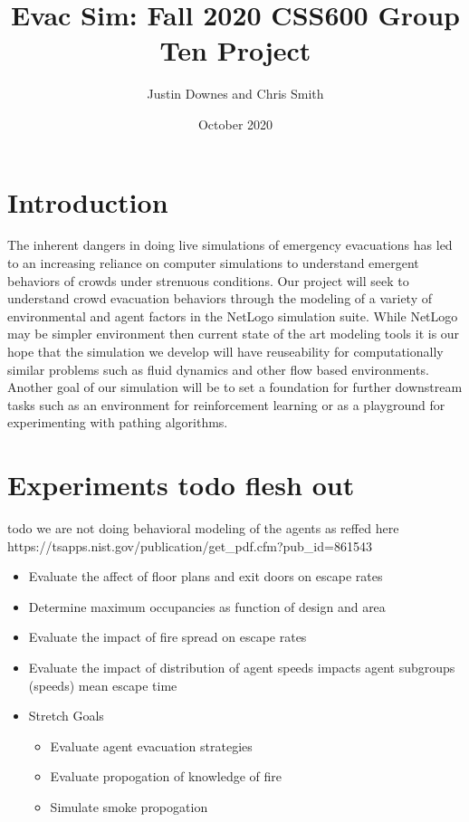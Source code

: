 \documentclass[12pt,letterpaper]{article}
\begin{document}
\title{\vspace{-3cm}Evac Sim: Fall 2020 CSS600 Group Ten Project}
\author{Justin Downes and Chris Smith}
\date{October 2020}
\maketitle

\section {Introduction}

The inherent dangers in doing live simulations of emergency evacuations has led to an increasing reliance on computer simulations to understand emergent behaviors of crowds under strenuous conditions\cite{almeidaCrowdSimulationModeling2013}.  Our project will seek to understand crowd evacuation behaviors through the modeling of a variety of environmental and agent factors in the NetLogo simulation suite. While NetLogo may be simpler environment then current state of the art modeling tools it is our hope that the simulation we develop will have reuseability for computationally similar problems such as fluid dynamics and other flow based environments. Another goal of our simulation will be to set a foundation for further downstream tasks such as an environment for reinforcement learning or as a playground for experimenting with pathing algorithms.

\section {Experiments todo flesh out}
todo we are not doing behavioral modeling of the agents as reffed here  https://tsapps.nist.gov/publication/get\_pdf.cfm?pub\_id=861543

\begin{itemize}
\item Evaluate the affect of floor plans and exit doors on escape rates
\item Determine maximum occupancies as function of design and area
\item Evaluate the impact of fire spread on escape rates
\item Evaluate the impact of distribution of agent speeds impacts agent subgroups (speeds) mean escape time
\item Stretch Goals
\begin{itemize}
\item Evaluate agent evacuation strategies
\item Evaluate propogation of knowledge of fire
\item Simulate smoke propogation
\end{itemize}
\end{itemize}
\end{document}
